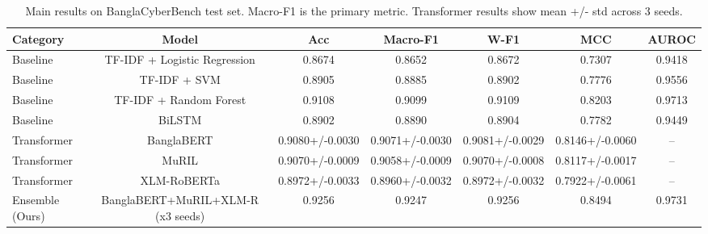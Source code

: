 \begin{table}[t]
\centering
\caption{Main results on BanglaCyberBench test set. Macro-F1 is the primary metric. Transformer results show mean +/- std across 3 seeds.}
\label{tab:main_results}
\begin{tabular}{lcccccc}
\toprule
Category & Model & Acc & Macro-F1 & W-F1 & MCC & AUROC \\
\midrule
Baseline & TF-IDF + Logistic Regression & 0.8674 & 0.8652 & 0.8672 & 0.7307 & 0.9418 \\
Baseline & TF-IDF + SVM & 0.8905 & 0.8885 & 0.8902 & 0.7776 & 0.9556 \\
Baseline & TF-IDF + Random Forest & 0.9108 & 0.9099 & 0.9109 & 0.8203 & 0.9713 \\
Baseline & BiLSTM & 0.8902 & 0.8890 & 0.8904 & 0.7782 & 0.9449 \\
Transformer & BanglaBERT & 0.9080+/-0.0030 & 0.9071+/-0.0030 & 0.9081+/-0.0029 & 0.8146+/-0.0060 & -- \\
Transformer & MuRIL & 0.9070+/-0.0009 & 0.9058+/-0.0009 & 0.9070+/-0.0008 & 0.8117+/-0.0017 & -- \\
Transformer & XLM-RoBERTa & 0.8972+/-0.0033 & 0.8960+/-0.0032 & 0.8972+/-0.0032 & 0.7922+/-0.0061 & -- \\
Ensemble (Ours) & BanglaBERT+MuRIL+XLM-R (x3 seeds) & 0.9256 & 0.9247 & 0.9256 & 0.8494 & 0.9731 \\
\bottomrule
\end{tabular}
\end{table}
